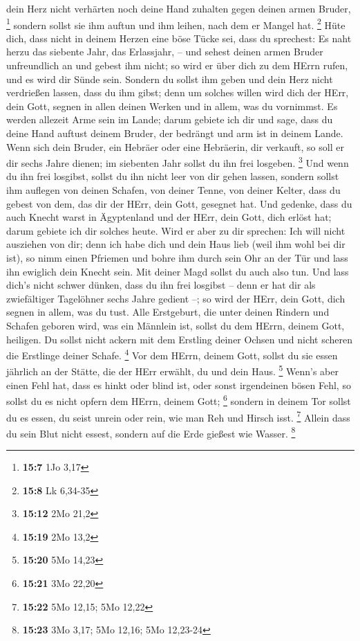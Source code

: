 dein Herz nicht verhärten noch deine Hand zuhalten gegen deinen armen
Bruder, \footnote{\textbf{15:7} 1Jo 3,17}  sondern sollst
sie ihm auftun und ihm leihen, nach dem er Mangel hat. \footnote{\textbf{15:8}
  Lk 6,34-35}  Hüte dich, dass nicht in deinem Herzen eine
böse Tücke sei, dass du sprechest: Es naht herzu das siebente Jahr, das
Erlassjahr, -- und sehest deinen armen Bruder unfreundlich an und gebest
ihm nicht; so wird er über dich zu dem HErrn rufen, und es wird dir
Sünde sein.  Sondern du sollst ihm geben und dein Herz
nicht verdrießen lassen, dass du ihm gibst; denn um solches willen wird
dich der HErr, dein Gott, segnen in allen deinen Werken und in allem,
was du vornimmst.  Es werden allezeit Arme sein im Lande;
darum gebiete ich dir und sage, dass du deine Hand auftust deinem
Bruder, der bedrängt und arm ist in deinem Lande.  Wenn
sich dein Bruder, ein Hebräer oder eine Hebräerin, dir verkauft, so soll
er dir sechs Jahre dienen; im siebenten Jahr sollst du ihn frei
losgeben. \footnote{\textbf{15:12} 2Mo 21,2}  Und wenn du
ihn frei losgibst, sollst du ihn nicht leer von dir gehen lassen,
 sondern sollst ihm auflegen von deinen Schafen, von deiner
Tenne, von deiner Kelter, dass du gebest von dem, das dir der HErr, dein
Gott, gesegnet hat.  Und gedenke, dass du auch Knecht warst
in Ägyptenland und der HErr, dein Gott, dich erlöst hat; darum gebiete
ich dir solches heute.  Wird er aber zu dir sprechen: Ich
will nicht ausziehen von dir; denn ich habe dich und dein Haus lieb
(weil ihm wohl bei dir ist),  so nimm einen Pfriemen und
bohre ihm durch sein Ohr an der Tür und lass ihn ewiglich dein Knecht
sein. Mit deiner Magd sollst du auch also tun.  Und lass
dich's nicht schwer dünken, dass du ihn frei losgibst -- denn er hat dir
als zwiefältiger Tagelöhner sechs Jahre gedient --; so wird der HErr,
dein Gott, dich segnen in allem, was du tust.  Alle
Erstgeburt, die unter deinen Rindern und Schafen geboren wird, was ein
Männlein ist, sollst du dem HErrn, deinem Gott, heiligen. Du sollst
nicht ackern mit dem Erstling deiner Ochsen und nicht scheren die
Erstlinge deiner Schafe. \footnote{\textbf{15:19} 2Mo 13,2}
 Vor dem HErrn, deinem Gott, sollst du sie essen jährlich
an der Stätte, die der HErr erwählt, du und dein Haus. \footnote{\textbf{15:20}
  5Mo 14,23}  Wenn's aber einen Fehl hat, dass es hinkt
oder blind ist, oder sonst irgendeinen bösen Fehl, so sollst du es nicht
opfern dem HErrn, deinem Gott; \footnote{\textbf{15:21} 3Mo 22,20}
 sondern in deinem Tor sollst du es essen, du seist unrein
oder rein, wie man Reh und Hirsch isst. \footnote{\textbf{15:22} 5Mo
  12,15; 5Mo 12,22}  Allein dass du sein Blut nicht essest,
sondern auf die Erde gießest wie Wasser. \footnote{\textbf{15:23} 3Mo
  3,17; 5Mo 12,16; 5Mo 12,23-24}


